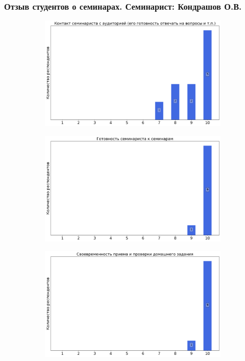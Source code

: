 	\subsubsection{Отзыв студентов о семинарах. Семинарист: Кондрашов О.В.}
		\begin{figure}[H]
			\centering
			\begin{subfigure}[b]{0.45\textwidth}
				\centering
				\includegraphics[width=\textwidth]{images/1 course/Математический анализ/seminarists-marks-Кондрашов О.В.-0.png}
			\end{subfigure}
			\begin{subfigure}[b]{0.45\textwidth}
				\centering
				\includegraphics[width=\textwidth]{images/1 course/Математический анализ/seminarists-marks-Кондрашов О.В.-1.png}
			\end{subfigure}
			\begin{subfigure}[b]{0.45\textwidth}
				\centering
				\includegraphics[width=\textwidth]{images/1 course/Математический анализ/seminarists-marks-Кондрашов О.В.-2.png}

\end{subfigure}
\end{figure}
